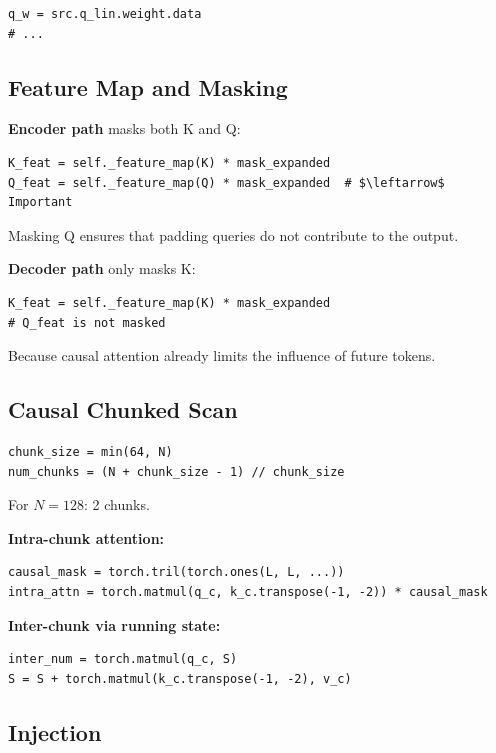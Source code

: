 \begin{lstlisting}
q_w = src.q_lin.weight.data
# ...
\end{lstlisting}

\subsection{Feature Map and Masking}

\textbf{Encoder path} masks both K and Q:

\begin{lstlisting}
K_feat = self._feature_map(K) * mask_expanded
Q_feat = self._feature_map(Q) * mask_expanded  # $\leftarrow$ Important
\end{lstlisting}

Masking Q ensures that padding queries do not contribute to the output.

\textbf{Decoder path} only masks K:

\begin{lstlisting}
K_feat = self._feature_map(K) * mask_expanded
# Q_feat is not masked
\end{lstlisting}

Because causal attention already limits the influence of future tokens.

\subsection{Causal Chunked Scan}

\begin{lstlisting}
chunk_size = min(64, N)
num_chunks = (N + chunk_size - 1) // chunk_size
\end{lstlisting}

For $N = 128$: 2 chunks.

\textbf{Intra-chunk attention:}

\begin{lstlisting}
causal_mask = torch.tril(torch.ones(L, L, ...))
intra_attn = torch.matmul(q_c, k_c.transpose(-1, -2)) * causal_mask
\end{lstlisting}

\textbf{Inter-chunk via running state:}

\begin{lstlisting}
inter_num = torch.matmul(q_c, S)
S = S + torch.matmul(k_c.transpose(-1, -2), v_c)
\end{lstlisting}

\subsection{Injection}

